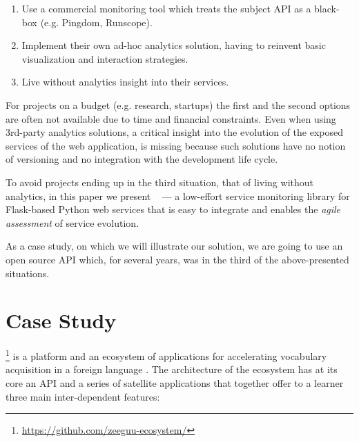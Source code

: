 \documentclass[conference]{IEEEtran}
\begin{document}
  \begin{enumerate}

    \item Use a commercial monitoring tool which treats the subject API as a black-box (e.g. Pingdom, Runscope). 

    \item Implement their own ad-hoc analytics solution, having to reinvent basic visualization and interaction strategies. 

    \item Live without analytics insight into their services.

  \end{enumerate}


For projects on a budget (e.g. research, startups) the first and the second options are often not available due to time and financial constraints. Even when using 3rd-party analytics solutions, a critical insight into the evolution of the exposed services of the web application, is missing because such solutions have no notion of versioning and no integration with the development life cycle.~\cite{papazoglou2011managing}

To avoid projects ending up in the third situation, that of living without analytics, in this paper we present \tool~ --- a low-effort service monitoring library for Flask-based Python web services that is easy to integrate and enables the {\em agile assessment} of service evolution. \cite{Nier12b}

As a case study, on which we will illustrate our solution, we are going to use an open source API which, for several years, was in the third of the above-presented situations.



\section{Case Study}
\label{sec:case}
  \zee\footnote{\url{https://github.com/zeeguu-ecosystem/}} is a platform and an ecosystem of applications for accelerating vocabulary acquisition in a foreign language \cite{Lungu16}. 
The architecture of the ecosystem has at its core an API and a series of satellite applications that together offer to a learner three main inter-dependent features:
\end{document}
